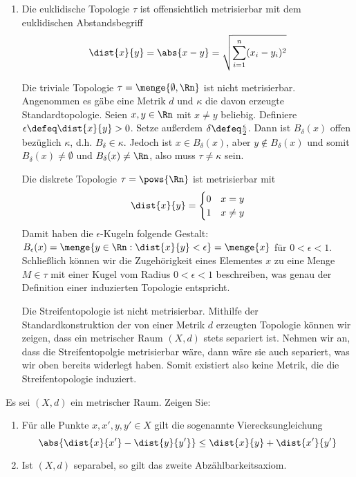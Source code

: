 \begin{exercisePage}
\begin{enumerate}[leftmargin=\zulength, label=(zu \alph*)]
	\item Die euklidische Topologie $\tau$ ist offensichtlich metrisierbar mit dem euklidischen Abstandsbegriff 
	\begin{equation*}
		\dist{x}{y} = \abs{x - y} = \sqrt{\sum_{i=1}^{n} (x_i - y_i)^2}
	\end{equation*}
	
	Die triviale Topologie $\tau = \menge{\emptyset, \Rn}$ ist nicht metrisierbar. Angenommen es gäbe eine Metrik $d$ und $\kappa$ die davon erzeugte Standardtopologie. Seien $x,y \in \Rn$ mit $x \neq y$ beliebig. Definiere $\epsilon \defeq \dist{x}{y} > 0$. Setze außerdem $\delta \defeq \frac{\epsilon}{2}$. Dann ist $B_\delta(x)$ offen bezüglich $\kappa$, d.h. $B_\delta \in \kappa$. Jedoch ist $x \in B_\delta(x)$, aber $y \notin B_\delta(x)$ und somit $B_\delta(x) \neq \emptyset$ und $B_\delta(x) \neq \Rn$, also muss $\tau \neq \kappa$ sein.
	
	Die diskrete Topologie $\tau = \pows{\Rn}$ ist metrisierbar mit 
	\begin{equation*}
		\dist{x}{y} = \begin{cases} 0 & x = y \\ 1 & x \neq y \end{cases}
	\end{equation*}
	Damit haben die $\epsilon$-Kugeln folgende Gestalt: $B_\epsilon(x) = \menge{y \in \Rn: \dist{x}{y} < \epsilon} = \menge{x}$ für $0 < \epsilon < 1$.
	Schließlich können wir die Zugehörigkeit eines Elementes $x$ zu eine Menge $M \in \tau$ mit einer Kugel vom Radius $0 < \epsilon < 1$ beschreiben, was genau der Definition einer induzierten Topologie entspricht.
	
	Die Streifentopologie ist nicht metrisierbar. Mithilfe der Standardkonstruktion der von einer Metrik $d$ erzeugten Topologie können wir zeigen, dass ein metrischer Raum $(X,d)$ stets separiert ist. Nehmen wir an, dass die Streifentopolgie metrisierbar wäre, dann wäre sie auch separiert, was wir oben bereits widerlegt haben. Somit existiert also keine Metrik, die die Streifentopologie induziert.
\end{enumerate}


\begin{exercise}
	Es sei $(X, d)$ ein metrischer Raum. Zeigen Sie:
	\begin{enumerate}[leftmargin=*, nolistsep, topsep=-\parskip]
		\item Für alle Punkte $x, x', y, y' \in X$ gilt die sogenannte Vierecksungleichung
		\begin{equation*}
			\abs{\dist{x}{x'} - \dist{y}{y'}} \le \dist{x}{y} + \dist{x'}{y'}
		\end{equation*}
		\item Ist $(X, d)$ separabel, so gilt das zweite Abzählbarkeitsaxiom.
	\end{enumerate}
\end{exercise}


\end{exercisePage}
